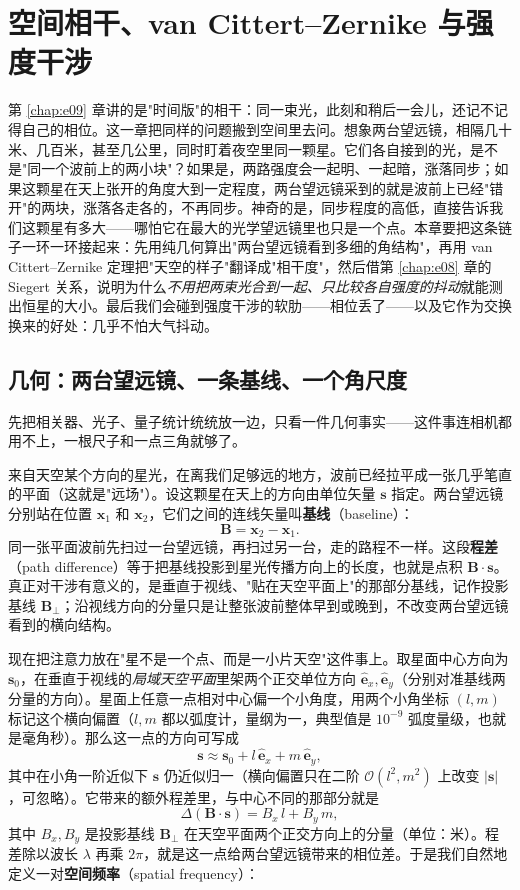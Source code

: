 \chapter{空间相干、van Cittert--Zernike 与强度干涉}
\label{chap:e10}

\begin{chapteropening}
第 \ref{chap:e09} 章讲的是"时间版"的相干：同一束光，此刻和稍后一会儿，还记不记得自己的相位。这一章把同样的问题搬到空间里去问。想象两台望远镜，相隔几十米、几百米，甚至几公里，同时盯着夜空里同一颗星。它们各自接到的光，是不是"同一个波前上的两小块"？如果是，两路强度会一起明、一起暗，涨落同步；如果这颗星在天上张开的角度大到一定程度，两台望远镜采到的就是波前上已经"错开"的两块，涨落各走各的，不再同步。神奇的是，同步程度的高低，直接告诉我们这颗星有多大——哪怕它在最大的光学望远镜里也只是一个点。本章要把这条链子一环一环接起来：先用纯几何算出"两台望远镜看到多细的角结构"，再用 van Cittert--Zernike 定理把"天空的样子"翻译成"相干度"，然后借第 \ref{chap:e08} 章的 Siegert 关系，说明为什么\emph{不用把两束光合到一起、只比较各自强度的抖动}就能测出恒星的大小。最后我们会碰到强度干涉的软肋——相位丢了——以及它作为交换换来的好处：几乎不怕大气抖动。
\end{chapteropening}

\section{几何：两台望远镜、一条基线、一个角尺度}
\label{sec:e10-geometry}

先把相关器、光子、量子统计统统放一边，只看一件几何事实——这件事连相机都用不上，一根尺子和一点三角就够了。

来自天空某个方向的星光，在离我们足够远的地方，波前已经拉平成一张几乎笔直的平面（这就是"远场"）。设这颗星在天上的方向由单位矢量 \(\bm s\) 指定。两台望远镜分别站在位置 \(\bm x_1\) 和 \(\bm x_2\)，它们之间的连线矢量叫\textbf{基线}（baseline）：
\[
  \bm B=\bm x_2-\bm x_1 .
\]
同一张平面波前先扫过一台望远镜，再扫过另一台，走的路程不一样。这段\textbf{程差}（path difference）等于把基线投影到星光传播方向上的长度，也就是点积 \(\bm B\cdot\bm s\)。真正对干涉有意义的，是垂直于视线、"贴在天空平面上"的那部分基线，记作投影基线 \(\bm B_\perp\)；沿视线方向的分量只是让整张波前整体早到或晚到，不改变两台望远镜看到的横向结构。

现在把注意力放在"星不是一个点、而是一小片天空"这件事上。取星面中心方向为 \(\bm s_0\)，在垂直于视线的\emph{局域天空平面}里架两个正交单位方向 \(\hat{\bm e}_x,\hat{\bm e}_y\)（分别对准基线两分量的方向）。星面上任意一点相对中心偏一个小角度，用两个小角坐标 \((l,m)\) 标记这个横向偏置（\(l,m\) 都以弧度计，量纲为一，典型值是 \(10^{-9}\) 弧度量级，也就是毫角秒）。那么这一点的方向可写成
\[
  \bm s\approx\bm s_0+l\,\hat{\bm e}_x+m\,\hat{\bm e}_y ,
\]
其中在小角一阶近似下 \(\bm s\) 仍近似归一（横向偏置只在二阶 \(\mathcal O(l^2,m^2)\) 上改变 \(|\bm s|\)，可忽略）。它带来的额外程差里，与中心不同的那部分就是
\[
  \Delta(\bm B\cdot\bm s)=B_x\,l+B_y\,m ,
\]
其中 \(B_x,B_y\) 是投影基线 \(\bm B_\perp\) 在天空平面两个正交方向上的分量（单位：米）。程差除以波长 \(\lambda\) 再乘 \(2\pi\)，就是这一点给两台望远镜带来的相位差。于是我们自然地定义一对\textbf{空间频率}（spatial frequency）：

